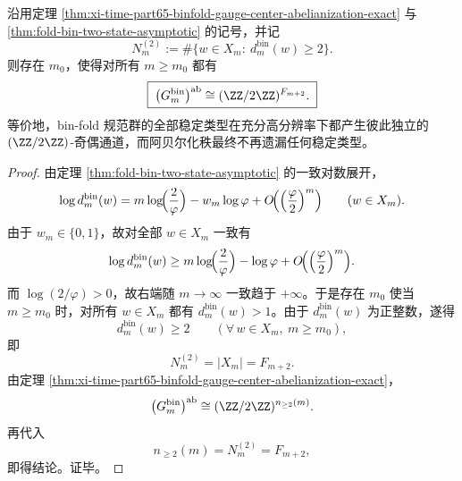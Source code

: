 \begin{theorem}\label{thm:xi-time-part65-binfold-abel-eventual-full-rank}
沿用定理 \ref{thm:xi-time-part65-binfold-gauge-center-abelianization-exact} 与
\ref{thm:fold-bin-two-state-asymptotic} 的记号，并记
\[
N_m^{(2)}:=\#\{w\in X_m:\ d_m^{\mathrm{bin}}(w)\ge 2\}.
\]
则存在 \(m_0\)，使得对所有 \(m\ge m_0\) 都有
\[
\boxed{\;
\bigl(G_m^{\mathrm{bin}}\bigr)^{\mathrm{ab}}
\cong
(\ZZ/2\ZZ)^{F_{m+2}}.\;}
\]
等价地，bin-fold 规范群的全部稳定类型在充分高分辨率下都产生彼此独立的 \((\ZZ/2\ZZ)\)-奇偶通道，而阿贝尔化秩最终不再遗漏任何稳定类型。
\end{theorem}
\begin{proof}
由定理 \ref{thm:fold-bin-two-state-asymptotic} 的一致对数展开，
\[
\log d_m^{\mathrm{bin}}(w)
=
m\log\!\Bigl(\frac{2}{\varphi}\Bigr)-w_m\log\varphi
+O\!\Bigl(\Bigl(\frac{\varphi}{2}\Bigr)^m\Bigr)
\qquad (w\in X_m).
\]
由于 \(w_m\in\{0,1\}\)，故对全部 \(w\in X_m\) 一致有
\[
\log d_m^{\mathrm{bin}}(w)
\ge
m\log\!\Bigl(\frac{2}{\varphi}\Bigr)-\log\varphi
+O\!\Bigl(\Bigl(\frac{\varphi}{2}\Bigr)^m\Bigr).
\]
而 \(\log(2/\varphi)>0\)，故右端随 \(m\to\infty\) 一致趋于 \(+\infty\)。于是存在 \(m_0\) 使当 \(m\ge m_0\) 时，对所有 \(w\in X_m\) 都有 \(d_m^{\mathrm{bin}}(w)>1\)。由于 \(d_m^{\mathrm{bin}}(w)\) 为正整数，遂得
\[
d_m^{\mathrm{bin}}(w)\ge 2
\qquad(\forall\,w\in X_m,\ m\ge m_0),
\]
即
\[
N_m^{(2)}=|X_m|=F_{m+2}.
\]
由定理 \ref{thm:xi-time-part65-binfold-gauge-center-abelianization-exact}，
\[
\bigl(G_m^{\mathrm{bin}}\bigr)^{\mathrm{ab}}
\cong
(\ZZ/2\ZZ)^{n_{\ge 2}(m)}.
\]
再代入
\[
n_{\ge 2}(m)=N_m^{(2)}=F_{m+2},
\]
即得结论。证毕。
\end{proof}

